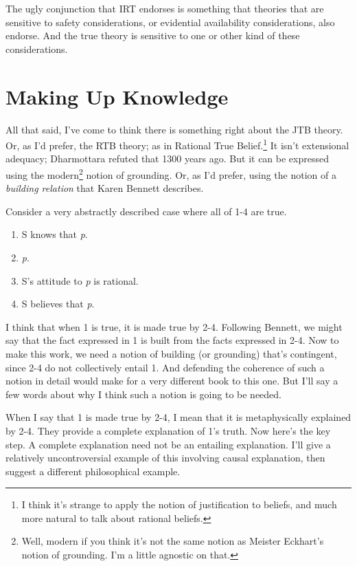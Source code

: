 \documentclass[
  11pt,
]{book}
\providecommand{\tightlist}{%
  \setlength{\itemsep}{0pt}\setlength{\parskip}{0pt}}
\begin{document}
The ugly conjunction that IRT endorses is something that theories that are sensitive to safety considerations, or evidential availability considerations, also endorse. And the true theory is sensitive to one or other kind of these considerations.

\hypertarget{building}{%
\section{Making Up Knowledge}\label{building}}

All that said, I've come to think there is something right about the JTB theory. Or, as I'd prefer, the RTB theory; as in Rational True Belief.\footnote{I think it's strange to apply the notion of justification to beliefs, and much more natural to talk about rational beliefs.} It isn't extensional adequacy; Dharmottara refuted that 1300 years ago. But it can be expressed using the modern\footnote{Well, modern if you think it's not the same notion as Meister Eckhart's notion of grounding. I'm a little agnostic on that.} notion of grounding. Or, as I'd prefer, using the notion of a \emph{building relation} that Karen Bennett \citeyearpar{Bennett2017} describes.

Consider a very abstractly described case where all of 1-4 are true.

\begin{enumerate}
\def\labelenumi{\arabic{enumi}.}
\tightlist
\item
  S knows that \emph{p}.
\item
  \emph{p}.
\item
  S's attitude to \emph{p} is rational.
\item
  S believes that \emph{p}.
\end{enumerate}

I think that when 1 is true, it is made true by 2-4. Following Bennett, we might say that the fact expressed in 1 is built from the facts expressed in 2-4. Now to make this work, we need a notion of building (or grounding) that's contingent, since 2-4 do not collectively entail 1. And defending the coherence of such a notion in detail would make for a very different book to this one. But I'll say a few words about why I think such a notion is going to be needed.

When I say that 1 is made true by 2-4, I mean that it is metaphysically explained by 2-4. They provide a complete explanation of 1's truth. Now here's the key step. A complete explanation need not be an entailing explanation. I'll give a relatively uncontroversial example of this involving causal explanation, then suggest a different philosophical example.
\end{document}

